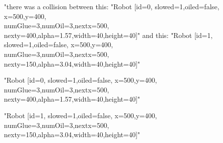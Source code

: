 \begin{itemize}
		 "there was a collision between this: "Robot [id=0,  slowed=1,oiled=false, x=500,y=400, 
		\\numGlue=3,numOil=3,nextx=500,
		\\nexty=400,alpha=1.57,width=40,height=40]"\newline
		and this:
		"Robot [id=1,  slowed=1,oiled=false, x=500,y=400, 
		\\numGlue=3,numOil=3,nextx=500,
		\\nexty=150,alpha=3.04,width=40,height=40]"\newline
		
	    "Robot [id=0,  slowed=1,oiled=false, x=500,y=400, 
		\\numGlue=3,numOil=3,nextx=500,
		\\nexty=400,alpha=1.57,width=40,height=40]"\newline
		
		"Robot [id=1,  slowed=1,oiled=false, x=500,y=400, 
		\\numGlue=3,numOil=3,nextx=500,
		\\nexty=150,alpha=3.04,width=40,height=40]"\newline

\end{itemize}
